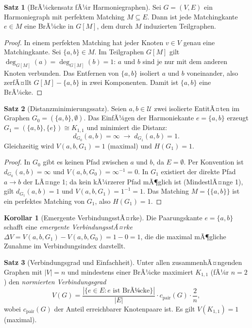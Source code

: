 ﻿\documentclass[a4paper,12pt]{article}
\theoremstyle{definition}
\newtheorem{satz}{Satz}
\newtheorem{korollar}{Korollar}
\begin{document}
\begin{satz}[BrÃ¼ckensatz fÃ¼r Harmoniegraphen]
	\label{satz:bruecke}
	Sei $G = (V, E)$ ein Harmoniegraph mit perfektem Matching $M \subseteq E$.
	Dann ist jede Matchingkante $e \in M$ eine BrÃ¼cke in $G[M]$,
	dem durch $M$ induzierten Teilgraphen.
\end{satz}

\begin{proof}
	In einem perfekten Matching hat jeder Knoten $v \in V$ genau eine Matchingkante.
	Sei $\{a, b\} \in M$. Im Teilgraphen $G[M]$ gilt $\deg_{G[M]}(a) = \deg_{G[M]}(b) = 1$:
	$a$ und $b$ sind je nur mit dem anderen Knoten verbunden.
	Das Entfernen von $\{a,b\}$ isoliert $a$ und $b$ voneinander, also zerfÃ¤llt
	$G[M] - \{a,b\}$ in zwei Komponenten. Damit ist $\{a,b\}$ eine BrÃ¼cke. \qedhere
\end{proof}

\begin{satz}[Distanzminimierungssatz]
	\label{satz:distanz}
	Seien $a, b \in \mathcal{U}$ zwei isolierte EntitÃ¤ten im Graphen
	$G_0 = (\{a,b\}, \emptyset)$.
	Das EinfÃ¼gen der Harmoniekante $e = \{a,b\}$ erzeugt $G_1 = (\{a,b\}, \{e\})
	\cong K_{1,1}$ und minimiert die Distanz:
	\[
		d_{G_0}(a,b) = \infty \;\longrightarrow\; d_{G_1}(a,b) = 1.
	\]
	Gleichzeitig wird $V(a,b,G_1) = 1$ (maximal) und $H(G_1) = 1$.
\end{satz}

\begin{proof}
	In $G_0$ gibt es keinen Pfad zwischen $a$ und $b$, da $E = \emptyset$.
	Per Konvention ist $d_{G_0}(a,b) = \infty$ und $V(a,b,G_0) = \infty^{-1} = 0$.
	In $G_1$ existiert der direkte Pfad $a \to b$ der LÃ¤nge 1; da kein kÃ¼rzerer
	Pfad mÃ¶glich ist (MindestlÃ¤nge 1), gilt $d_{G_1}(a,b) = 1$ und
	$V(a,b,G_1) = 1^{-1} = 1$.
	Das Matching $M = \{\{a,b\}\}$ ist ein perfektes Matching von $G_1$, also $H(G_1) = 1$.
	\qedhere
\end{proof}

\begin{korollar}[Emergente VerbindungsstÃ¤rke]
	Die Paarungskante $e = \{a,b\}$ schafft eine \emph{emergente VerbindungsstÃ¤rke}
	$\Delta V = V(a,b,G_1) - V(a,b,G_0) = 1 - 0 = 1$, die die maximal mÃ¶gliche
	Zunahme im Verbindungsindex darstellt.
\end{korollar}

\begin{satz}[Verbindungsgrad und Einfachheit]
	\label{satz:verbindungsgrad}
	Unter allen zusammenhÃ¤ngenden Graphen mit $|V| = n$ und mindestens einer BrÃ¼cke
	maximiert $K_{1,1}$ (fÃ¼r $n=2$) den \emph{normierten Verbindungsgrad}
	\[
		V(G) = \frac{|\{e \in E : e \text{ ist BrÃ¼cke}\}|}{|E|}
		       \cdot c_{\mathrm{pair}}(G) \cdot \frac{2}{n},
	\]
	wobei $c_{\mathrm{pair}}(G)$ der Anteil erreichbarer Knotenpaare ist.
	Es gilt $V(K_{1,1}) = 1$ (maximal).
\end{satz}
\end{document}
